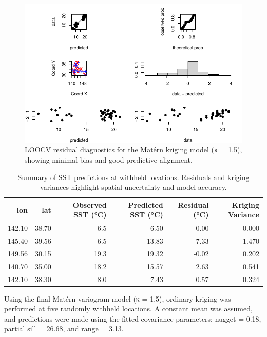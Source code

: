 \documentclass[
  11pt,
]{article}
\begin{document}
\begin{figure}[H]

{\centering \includegraphics{project_files/figure-pdf/fig-cvkrig-1.pdf}

}

\caption{LOOCV residual diagnostics for the Matérn kriging model (κ =
1.5), showing minimal bias and good predictive alignment.}

\end{figure}%

\begin{table}

\caption{Summary of SST predictions at withheld locations. Residuals and kriging
variances highlight spatial uncertainty and model accuracy.}
\centering
\begin{tabular}[t]{rrrrrr}
\toprule
lon & lat & Observed SST (°C) & Predicted SST (°C) & Residual (°C) & Kriging Variance\\
\midrule
142.10 & 38.70 & 6.5 & 6.50 & 0.00 & 0.000\\
145.40 & 39.56 & 6.5 & 13.83 & -7.33 & 1.470\\
149.56 & 30.15 & 19.3 & 19.32 & -0.02 & 0.202\\
140.70 & 35.00 & 18.2 & 15.57 & 2.63 & 0.541\\
142.10 & 38.30 & 8.0 & 7.43 & 0.57 & 0.324\\
\bottomrule
\end{tabular}
\end{table}

Using the final Matérn variogram model (κ = 1.5), ordinary kriging was
performed at five randomly withheld locations. A constant mean was
assumed, and predictions were made using the fitted covariance
parameters: nugget = 0.18, partial sill = 26.68, and range = 3.13.
\end{document}
